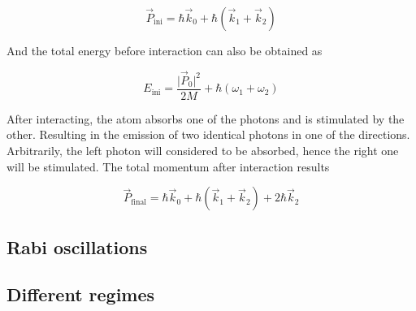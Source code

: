 \begin{equation}
	\vec{P}_\text{ini} = \hbar \vec{k}_0 + \hbar (\vec{k}_1 + \vec{k}_2)
\end{equation}

And the total energy before interaction can also be obtained as

\begin{equation}
	E_\text{ini} = \frac{\mathopen|\vec{P}_0\mathclose|^2}{2M} + \hbar (\omega_1 + \omega_2)
\end{equation}

After interacting, the atom absorbs one of the photons and is stimulated by the other. Resulting in the emission of two identical photons in one of the directions. Arbitrarily, the left photon will considered to be absorbed, hence the right one will be stimulated. The total momentum after interaction results

\begin{equation}
	\vec{P}_\text{final} = \hbar \vec{k}_0 + \hbar (\vec{k}_1 + \vec{k}_2) + 2\hbar\vec{k}_2
\end{equation}

\newpage

\subsection{Rabi oscillations}

\newpage

\subsection{Different regimes}


